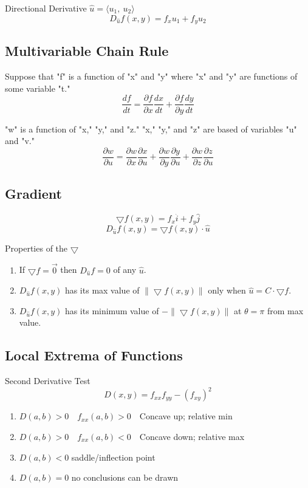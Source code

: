 \documentclass[12pt]{article}
\numberwithin{equation}{subsection}
\newcommand{\vecp}[1]{\langle #1 \rangle}
\newcommand{\magp}[1]{\| #1 \|}
\newcommand{\parx}[1]{\frac{\partial #1}{\partial x}}
\newcommand{\pary}[1]{\frac{\partial #1}{\partial y}}
\begin{document}
\begin{flushleft}
Directional Derivative $\hat{u}=\vecp{u_{1},\ u_{2}}$
\begin{equation}
D_{\hat{u}}f(x,y)=f_{x}u_{1}+f_{y}u_{2}
\end{equation}

\subsection{Multivariable Chain Rule}
Suppose that "f" is a function of "x" and "y" where "x" and "y" are functions of some variable "t."
\begin{equation}
\frac{df}{dt}=\parx{f}\frac{dx}{dt} + \pary{f}\frac{dy}{dt}
\end{equation}


"w" is a function of "x," "y," and "z." "x," "y," and "z" are based of variables "u" and "v."
\begin{equation}
\frac{\partial w}{\partial u}= \parx{w}\frac{\partial x}{\partial u}+\pary{w}\frac{\partial y}{\partial u}+\frac{\partial w}{\partial z}\frac{\partial z}{\partial u}
\end{equation}


\subsection{Gradient}
\begin{equation}
\bigtriangledown f(x,y)= f_{x}\hat{i}+f_{y}\hat{j}
\end{equation}
\begin{equation}
D_{\hat{u}}f(x,y)= \bigtriangledown f(x,y) \cdot \hat{u}
\end{equation}
\newpage

Properties of the $\bigtriangledown$
\begin{enumerate}
\item If $\bigtriangledown f=\vec{0}$ then $D_{\hat{u}}f=0$ of any $\hat{u}$.
\item $D_{\hat{u}}f(x,y)$ has its max value of $\magp{\bigtriangledown f(x,y)}$ only when $\hat{u}=C \cdot \bigtriangledown f$.
\item $D_{\hat{u}}f(x,y)$ has its minimum value of $-\magp{\bigtriangledown f(x,y)}$ at $\theta = \pi$ from max value.
\end{enumerate}

\subsection{Local Extrema of Functions}
Second Derivative Test
\begin{equation}
D(x,y)=f_{xx}f_{yy}-(f_{xy})^{2}
\end{equation}
\begin{enumerate}
\item $D(a,b) > 0$\ \ $f_{xx}(a,b)>0$\ \ Concave up; relative min
\item $D(a,b) > 0$\ \ $f_{xx}(a,b)<0$\ \ Concave down; relative max
\item $D(a,b) < 0$ saddle/inflection point
\item $D(a,b) = 0$ no conclusions can be drawn
\end{enumerate}


\end{flushleft}
\end{document}
